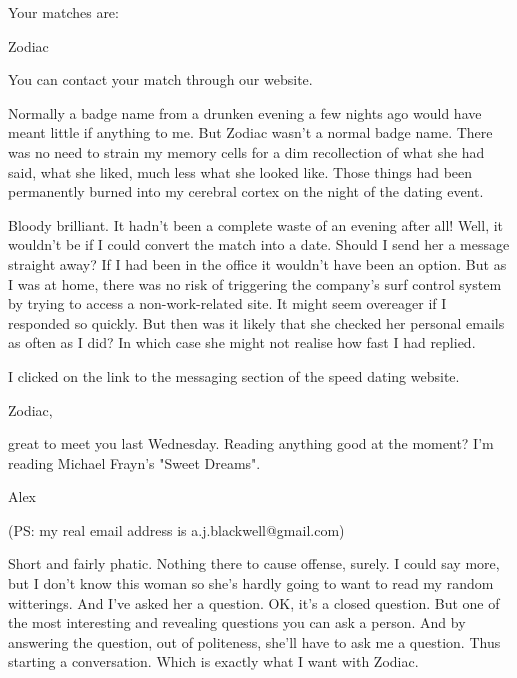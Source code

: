 \vskip 12pt

{\twelvett\obeylines Your matches are:

\vskip 12pt

Zodiac

\vskip 12pt

You can contact your match through our website.}

\vskip 12pt

Normally a badge name from a drunken evening a few nights ago would
have meant little if anything to me. But Zodiac wasn't a normal
badge name. There was no need to strain my memory cells for a dim
recollection of what she had said, what she liked, much less what
she looked like. Those things had been permanently burned into my
cerebral cortex on the night of the dating event.

Bloody brilliant. It hadn't been a complete waste of an evening
after all! Well, it wouldn't be if I could convert the match into a
date. Should I send her a message straight away? If I had been in
the office it wouldn't have been an option. But as I was at home,
there was no risk of triggering the company's surf control system by
trying to access a non-work-related site. It might seem overeager if
I responded so quickly. But then was it likely that she checked her
personal emails as often as I did? In which case she might not
realise how fast I had replied.

I clicked on the link to the messaging section of the speed dating
website.

\vskip 12pt

{\twelvett\obeylines Zodiac,

\vskip 12pt

great to meet you last Wednesday. Reading anything good at the
moment? I'm reading Michael Frayn's "Sweet Dreams".

\vskip 12pt

Alex

\vskip 12pt

(PS: my real email address is a.j.blackwell@gmail.com)}

\vskip 12pt

Short and fairly phatic. Nothing there to cause offense, surely. I
could say more, but I don't know this woman so she's hardly going to
want to read my random witterings. And I've asked her a question.
OK, it's a closed question. But one of the most interesting and
revealing questions you can ask a person. And by answering the
question, out of politeness, she'll have to ask me a question. Thus
starting a conversation. Which is exactly what I want with Zodiac.

